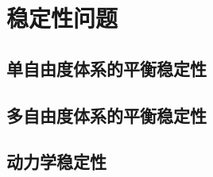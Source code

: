 

\section{稳定性问题}\label{4-6}

\subsection{单自由度体系的平衡稳定性}\label{4-6-1}

\subsection{多自由度体系的平衡稳定性}\label{4-6-2}

\subsection{动力学稳定性}\label{4-6-3}